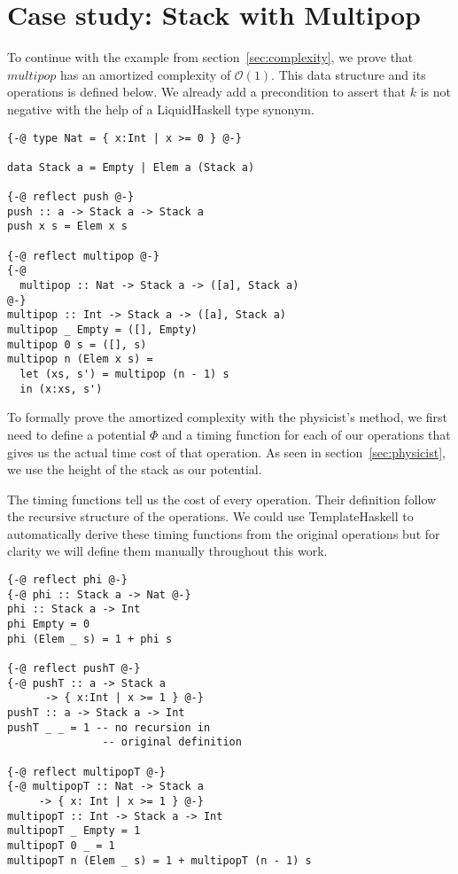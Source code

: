 \documentclass[sigplan,screen]{acmart}
\renewcommand\O[1]{$\mathcal{O}(#1)$}
\begin{document}
\section{Case study: Stack with Multipop}\label{sec:stack}

To continue with the example from section~\ref{sec:complexity}, we prove that $multipop$ has an amortized complexity of \O{1}. This data structure and its operations is defined below. We already add a precondition to assert that $k$ is not negative with the help of a LiquidHaskell type synonym.

\begin{lstlisting}
{-@ type Nat = { x:Int | x >= 0 } @-}

data Stack a = Empty | Elem a (Stack a)

{-@ reflect push @-}
push :: a -> Stack a -> Stack a
push x s = Elem x s

{-@ reflect multipop @-}
{-@
  multipop :: Nat -> Stack a -> ([a], Stack a)
@-}
multipop :: Int -> Stack a -> ([a], Stack a)
multipop _ Empty = ([], Empty)
multipop 0 s = ([], s)
multipop n (Elem x s) =
  let (xs, s') = multipop (n - 1) s
  in (x:xs, s')
\end{lstlisting}

To formally prove the amortized complexity with the physicist's method, we first need to define a potential $\Phi$ and a timing function for each of our operations that gives us the actual time cost of that operation. As seen in section~\ref{sec:physicist}, we use the height of the stack as our potential. 

The timing functions tell us the cost of every operation. Their definition follow the recursive structure of the operations. We could use TemplateHaskell to automatically derive these timing functions from the original operations but for clarity we will define them manually throughout this work.

\begin{lstlisting}
{-@ reflect phi @-}
{-@ phi :: Stack a -> Nat @-}
phi :: Stack a -> Int
phi Empty = 0
phi (Elem _ s) = 1 + phi s

{-@ reflect pushT @-}
{-@ pushT :: a -> Stack a
      -> { x:Int | x >= 1 } @-}
pushT :: a -> Stack a -> Int
pushT _ _ = 1 -- no recursion in
               -- original definition

{-@ reflect multipopT @-}
{-@ multipopT :: Nat -> Stack a
     -> { x: Int | x >= 1 } @-}
multipopT :: Int -> Stack a -> Int
multipopT _ Empty = 1
multipopT 0 _ = 1
multipopT n (Elem _ s) = 1 + multipopT (n - 1) s
\end{lstlisting}
\end{document}
